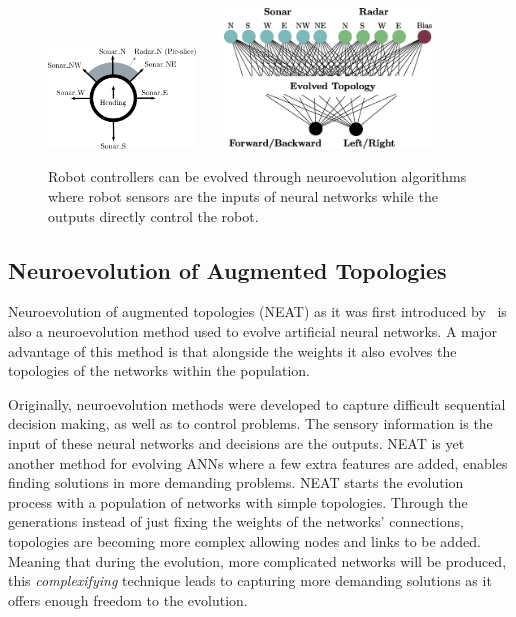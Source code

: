 \begin{figure}[t!]
\centering
\includegraphics[width=0.35\textwidth]{../Figures/Misc/RobotMaze.eps}\  \    \  \    
\includegraphics[width=0.49\textwidth]{../Figures/Misc/RobotMazeNetwork.eps}
\caption{Robot controllers can be evolved through neuroevolution algorithms where robot sensors are the inputs of neural networks while the outputs directly control the robot.}
\label{fig:robotExample}
\end{figure}


\subsection{Neuroevolution of Augmented Topologies}
\label{NEAT}

Neuroevolution of augmented topologies (NEAT) as it was first introduced by~\citep{stanley2002evolving} is also a neuroevolution method used to evolve artificial neural networks. A major advantage of this method is that alongside the weights it also evolves the topologies of the networks within the population.

Originally, neuroevolution methods were developed to capture difficult sequential decision making, as well as to control problems. The sensory information is the input of these neural networks and decisions are the outputs. NEAT is yet another method for evolving ANNs where a few extra features are added, enables finding solutions in more demanding problems. NEAT starts the evolution process with a population of networks with simple topologies. Through the generations instead of just fixing the weights of the networks' connections, topologies are becoming more complex allowing nodes and links to be added. Meaning that during the evolution, more complicated networks will be produced, this \emph{complexifying} technique leads to capturing more demanding solutions as it offers enough freedom to the evolution.


